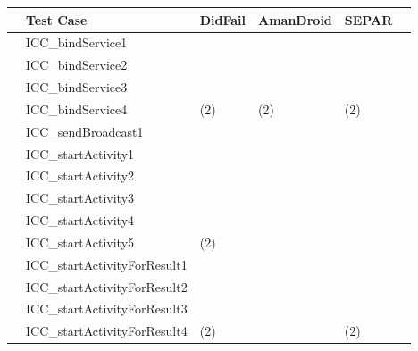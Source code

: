 \documentclass{article}
\begin{document}
\begin{table}
\newcommand{\tp}{\textbf{\normalsize{\textcolor{trueColor}{\CheckedBox}}}}
\newcommand{\fp}{\normalsize{\textcolor{falseColor}{\XBox}}}
\newcommand{\fn}{\normalsize{\textcolor{falseColor}{\Square}}}


\scriptsize
\centering
	\vspace{+0.3cm}
	\begin{tabular}{|p{0.07cm}|l|l|l|l|p{0.8cm}|}
		\hline
		& Test Case & DidFail & AmanDroid &  {\footnotesize S}EPAR \\ %
		\hline
		\hline
		\parbox[t]{2mm}{}
		&ICC\_bindService1    &\fp \fn	&\fn	 &\tp		\\
		&ICC\_bindService2    &\fn		&\fn	 &\tp		\\
		&ICC\_bindService3    &\fn		&\fn	 &\tp		\\
		&ICC\_bindService4    &\fp \scriptsize (\fn \scriptsize 2)	&\scriptsize (\fn \scriptsize 2)	 &\scriptsize (\tp \scriptsize 2)	\\
		&ICC\_sendBroadcast1  &\tp			&\tp &\tp \\
		&ICC\_startActivity1  &\fn 		&\tp	 &\tp \\
		&ICC\_startActivity2  &\fn			&\tp		&\tp \\
		&ICC\_startActivity3  &\fn			&\tp		&\tp \\
		&ICC\_startActivity4  &\fp		&	&		\\
		&ICC\_startActivity5  &\scriptsize (\fp \scriptsize 2)		&	&	\\
		&ICC\_startActivityForResult1 	&\fn		&\tp  &\tp	\\
		&ICC\_startActivityForResult2 &\fn		&\fn  &\tp \\
		&ICC\_startActivityForResult3 &\fn		&\fn\fp	&\tp	\\
		&ICC\_startActivityForResult4 &\scriptsize (\fn \scriptsize 2)	&\tp\fp\fn	 & \scriptsize (\tp \scriptsize 2)	\\

\end{tabular}
\end{table}
\end{document}
